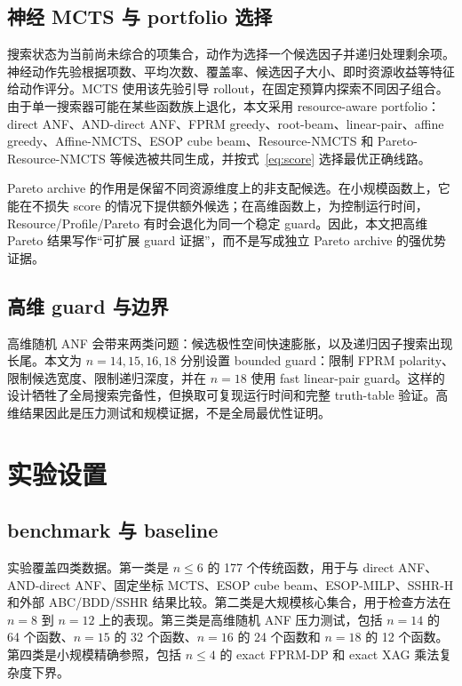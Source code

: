 \documentclass[UTF8,fontset=macnew,11pt]{ctexart}
\newcommand{\method}{Resource-NMCTS}
\newcommand{\pareto}{Pareto-Resource-NMCTS}
\begin{document}
\subsection{神经 MCTS 与 portfolio 选择}

搜索状态为当前尚未综合的项集合，动作为选择一个候选因子并递归处理剩余项。神经动作先验根据项数、平均次数、覆盖率、候选因子大小、即时资源收益等特征给动作评分。MCTS 使用该先验引导 rollout，在固定预算内探索不同因子组合。由于单一搜索器可能在某些函数族上退化，本文采用 resource-aware portfolio：direct ANF、AND-direct ANF、FPRM greedy、root-beam、linear-pair、affine greedy、Affine-NMCTS、ESOP cube beam、\method{} 和 \pareto{} 等候选被共同生成，并按式~\eqref{eq:score} 选择最优正确线路。

Pareto archive 的作用是保留不同资源维度上的非支配候选。在小规模函数上，它能在不损失 score 的情况下提供额外候选；在高维函数上，为控制运行时间，Resource/Profile/Pareto 有时会退化为同一个稳定 guard。因此，本文把高维 Pareto 结果写作“可扩展 guard 证据”，而不是写成独立 Pareto archive 的强优势证据。

\subsection{高维 guard 与边界}

高维随机 ANF 会带来两类问题：候选极性空间快速膨胀，以及递归因子搜索出现长尾。本文为 $n=14,15,16,18$ 分别设置 bounded guard：限制 FPRM polarity、限制候选宽度、限制递归深度，并在 $n=18$ 使用 fast linear-pair guard。这样的设计牺牲了全局搜索完备性，但换取可复现运行时间和完整 truth-table 验证。高维结果因此是压力测试和规模证据，不是全局最优性证明。

\section{实验设置}

\subsection{benchmark 与 baseline}

实验覆盖四类数据。第一类是 $n\leq 6$ 的 177 个传统函数，用于与 direct ANF、AND-direct ANF、固定坐标 MCTS、ESOP cube beam、ESOP-MILP、SSHR-H 和外部 ABC/BDD/SSHR 结果比较。第二类是大规模核心集合，用于检查方法在 $n=8$ 到 $n=12$ 上的表现。第三类是高维随机 ANF 压力测试，包括 $n=14$ 的 64 个函数、$n=15$ 的 32 个函数、$n=16$ 的 24 个函数和 $n=18$ 的 12 个函数。第四类是小规模精确参照，包括 $n\leq 4$ 的 exact FPRM-DP 和 exact XAG 乘法复杂度下界。
\end{document}
